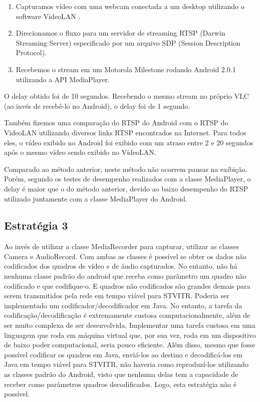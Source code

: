 \documentclass{acm_proc_article-sp}
\begin{document}
\begin{enumerate}
 \item Capturamos vídeo com uma webcam conectada a um desktop utilizando o software VideoLAN .
 \item Direcionamos o fluxo para um servidor de streaming RTSP (Darwin Streaming Server) especificado por um arquivo SDP (Session Description Protocol).
 \item Recebemos o stream em um Motorola Milestone rodando Android 2.0.1 utilizando a API MediaPlayer.
\end{enumerate}

O delay obtido foi de 10 segundos. Recebendo o mesmo stream no próprio VLC (ao invés de recebê-lo no Android), o delay foi de 1 segundo.	 	 	

Também fizemos uma comparação do RTSP do Android com o RTSP do VideoLAN utilizando diversos links RTSP encontrados na Internet. Para todos eles, o vídeo exibido no Android foi exibido com um atraso entre 2 e 20 segundos após o mesmo vídeo sendo exibido no VídeoLAN.

Comparado ao método anterior, neste método não ocorrem pausas na exibição. Porém, segundo os testes de desempenho realizados com a classe MediaPlayer, o delay é maior que o do método anterior, devido ao baixo desempenho do RTSP utilizado juntamente com a classe MediaPlayer do Android.

\subsection{Estratégia 3}

Ao invés de utilizar a classe MediaRecorder para capturar, utilizar as classes Camera e AudioRecord. Com ambas as classes é possível se obter os dados não codificados dos quadros de vídeo e de áudio capturados. No entanto, não há nenhuma classe padrão do android que receba como parâmetro um quadro não codificado e que codifique-o. E quadros não codificados são grandes demais para serem transmitidos pela rede em tempo viável para STVITR. Poderia ser implementado um codificador/decodificador em Java. No entanto, a tarefa da codificação/decodificação é extremamente custosa computacionalmente, além de ser muito complexa de ser desenvolvida. Implementar uma tarefa custosa em uma linguagem que roda em máquina virtual que, por sua vez, roda em um dispositivo de baixo poder computacional, seria pouco eficiente. Além disso, mesmo que fosse possível codificar os quadros em Java, enviá-los ao destino e decodificá-los em Java em tempo viável para STVITR, não haveria como reproduzí-los utilizando as classes padrão do Android, visto que nenhuma delas tem a capacidade de receber como parâmetros quadros decodificados. Logo, esta estratégia não é possível.
\end{document}
